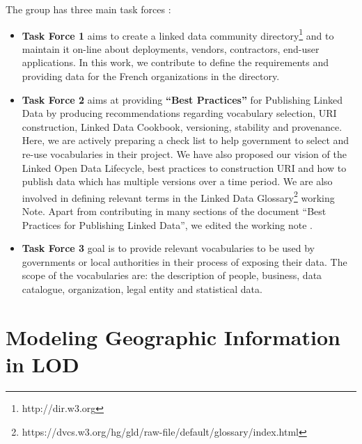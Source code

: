 \documentclass[a4paper,11pt]{report}
\begin{document}
The group has three main task forces :
\begin{itemize}
\item \textbf{Task Force 1} aims to create a linked data community directory\footnote{http://dir.w3.org} and to maintain it on-line about deployments, vendors, contractors, end-user applications. In this work, we contribute to define the requirements and providing data for the French organizations in the directory.
\item \textbf{Task Force 2} aims at providing \textbf{``Best Practices''} for Publishing Linked Data by producing recommendations regarding vocabulary selection, URI construction, Linked Data Cookbook, versioning, stability and provenance. Here, we are actively preparing a check list to help government to select and re-use vocabularies in their project. We have also proposed our vision of the Linked Open Data Lifecycle, best practices to construction URI and how to publish data which has multiple versions over a time period. We are also involved in defining relevant terms in the Linked Data Glossary\footnote{https://dvcs.w3.org/hg/gld/raw-file/default/glossary/index.html} working Note. Apart from contributing in many sections of the document ``Best Practices for Publishing Linked Data'', we edited the working note \cite{wood2012}.

\item \textbf{Task Force 3} goal is to  provide relevant vocabularies to be used by governments or local authorities in their process of exposing their data. The scope of the vocabularies are: the description of people, business, data catalogue, organization, legal entity and statistical data. 
\end{itemize}


\chapter{Modeling Geographic Information in LOD}
\end{document}
